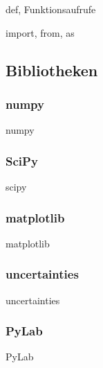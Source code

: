     \begin{frame}{def, Funktionsaufrufe}
    \end{frame}

    \begin{frame}{import, from, as}
    \end{frame}

  \subsection{Bibliotheken}
    \subsubsection{numpy}
      \begin{frame}{numpy}
      \end{frame}

    \subsubsection{SciPy}
      \begin{frame}{scipy}
      \end{frame}

    \subsubsection{matplotlib}
      \begin{frame}{matplotlib}
      \end{frame}

    \subsubsection{uncertainties}
      \begin{frame}{uncertainties}
      \end{frame}

    \subsubsection{PyLab}
      \begin{frame}{PyLab}
      \end{frame}
